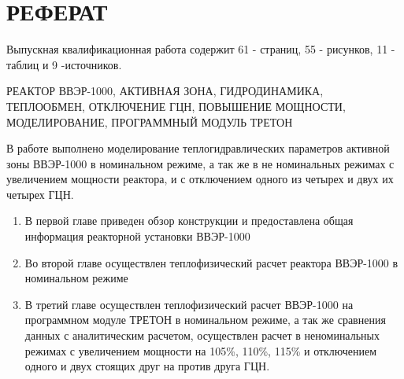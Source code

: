 \section*{РЕФЕРАТ}
Выпускная квалификационная работа содержит 61 - страниц, 55 - рисунков, 11 - таблиц и 9 -источников.

РЕАКТОР ВВЭР-1000, АКТИВНАЯ ЗОНА, ГИДРОДИНАМИКА, ТЕПЛООБМЕН, ОТКЛЮЧЕНИЕ ГЦН, ПОВЫШЕНИЕ МОЩНОСТИ,  МОДЕЛИРОВАНИЕ, ПРОГРАММНЫЙ МОДУЛЬ ТРЕТОН

В работе выполнено моделирование теплогидравлических параметров активной зоны ВВЭР-1000 в номинальном режиме, а так же в не номинальных режимах с увеличением мощности реактора, и с отключением одного из четырех и двух их четырех ГЦН.
\begin{enumerate}
    \item В первой главе приведен обзор конструкции и предоставлена общая информация реакторной установки ВВЭР-1000
    \item Во второй главе осуществлен теплофизический расчет реактора ВВЭР-1000 в номинальном режиме
    \item В третий главе осуществлен теплофизический расчет ВВЭР-1000 на программном модуле ТРЕТОН в номинальном режиме, а так же сравнения данных с аналитическим расчетом, осуществлен расчет в неноминальных режимах с увеличением мощности на 105\%, 110\%, 115\% и отключением одного и двух стоящих друг на против друга ГЦН. 
\end{enumerate}

